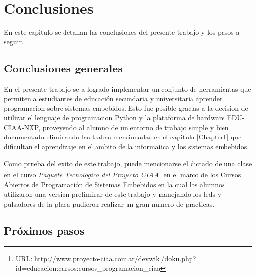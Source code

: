 
\chapter{Conclusiones} %

\label{Chapter5} %

En este capitulo se detallan las conclusiones del presente trabajo y los pasos a seguir.



\section{Conclusiones generales }

En el presente trabajo se a logrado implementar un conjunto de herramientas que permiten a estudiantes  de educación secundaria y universitaria aprender programacion sobre sistemas embebidos. Esto fue posible gracias a la decision de utilizar el lenguaje de programacion Python y la plataforma de hardware EDU-CIAA-NXP, proveyendo al alumno de un entorno de trabajo simple y bien documentado eliminando las trabas mencionadas en el capitulo \ref{Chapter1} que dificultan el aprendizaje en el ambito de la informatica y los sistemas embebidos.

Como prueba del exito de este trabajo, puede mencionarse el dictado de una clase en el curso \textit{Paquete Tecnologico del Proyecto CIAA}\footnote{URL: http://www.proyecto-ciaa.com.ar/devwiki/doku.php?id=educacion:cursos:cursos\_programacion\_ciaa} en el marco de los Cursos Abiertos de Programación de Sistemas Embebidos en la cual los alumnos utilizaron una version preliminar de este trabajo y manejando los leds y pulsadores de la placa pudieron realizar un gran numero de practicas.


\section{Próximos pasos}

